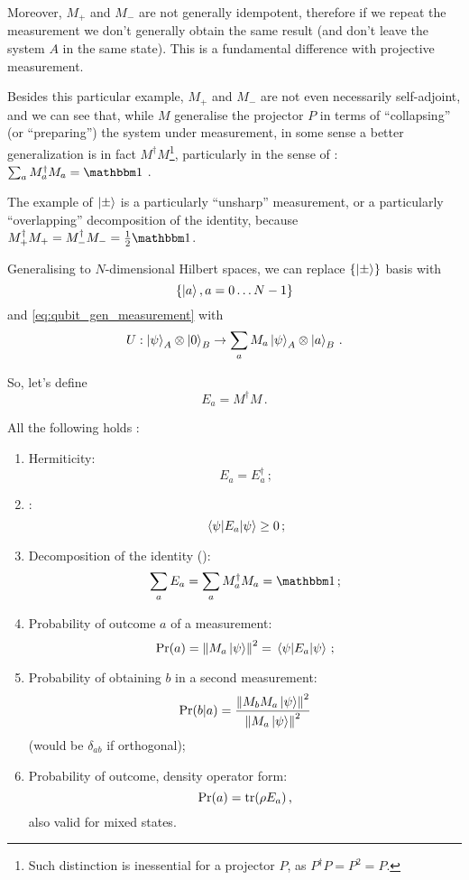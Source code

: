 Moreover, $M_+$ and $M_-$ are not generally idempotent,
therefore if we repeat the measurement we don't generally
obtain the same result (and don't leave the system $A$ in the same state).
This is a fundamental difference with projective measurement.

Besides this particular example, $M_+$ and $M_-$ are not even necessarily
self-adjoint, and we can see that, while $M$ generalise the projector $P$
in terms of ``collapsing'' (or ``preparing'') the system under measurement,
in some sense a better generalization is in fact $M^{\dagger}M$\footnote{
  Such distinction is inessential for a projector $P$,
  as $P^{\dagger}P = P^2 = P$.
}, particularly in the sense of :
$\sum_a M_a^{\dagger}M_a = \idop$ \parencite[Sec. 3.1]{PreskillNotes}.

The example of $\ket{\pm}$ is a particularly ``unsharp'' measurement,
or a particularly ``overlapping'' decomposition of the identity,
because $M_+^{\dagger}M_+ = M_-^{\dagger}M_- = \frac{1}{2}\idop$.

Generalising to $N$-dimensional Hilbert spaces, we can replace
$\left\{\ket{\pm}\right\}$ basis with
\[
  \left\{\ket{a}, a = 0\ldots N-1\right\}
\]
and \eqref{eq:qubit_gen_measurement} with
\begin{equation}\label{eq:gen_measurement}
  U: \ket{\psi}_A \otimes \ket{0}_B \rightarrow \sum_a M_a\ket{\psi}_A \otimes \ket{a}_B
  \,\text{.}
\end{equation}

So, let's define
\[
  E_a = M^{\dagger}M \,\text{.}
\]

All the following holds \parencite[Sec. 3.1]{PreskillNotes}:
\begin{enumerate}
  \item 
    Hermiticity: \[E_a = E_a^{\dagger}\,\text{;}\]
  \item
    : \[\expval{E_a}{\psi} \geq 0\,\text{;}\]  
  \item\label{listitem:POVM}
    Decomposition of the identity ():
    \begin{equation}\label{eq:POVM}
      \sum_a E_a = \sum_a M_a^{\dagger}M_a = \idop \,\text{;}
    \end{equation}
  \item
    Probability of outcome $a$ of a measurement:
    \[\Pr(a) = \norm{M_a\ket{\psi}}^2 = \expval{E_a}{\psi}\,\text{;}\]
  \item
    Probability of obtaining $b$ in a second measurement:
    \[\Pr(b|a) = \frac{\norm{M_bM_a\ket{\psi}}^2}{\norm{M_a\ket{\psi}}^2}\]
    (would be $\delta_{ab}$ if orthogonal);
  \item
    Probability of outcome, density operator form:
    \[\Pr(a) = \tr(\rho E_a)\,\text{,}\]
    also valid for mixed states.
\end{enumerate}


